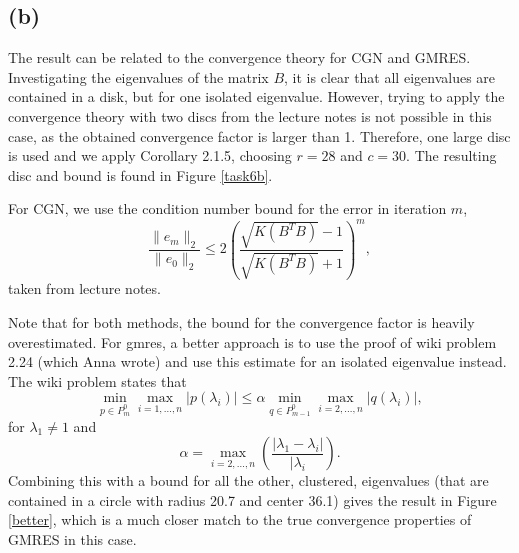 \subsection*{(b)}
The result can be related to the convergence theory for CGN and GMRES. Investigating the eigenvalues of the matrix $B$, it is clear that all eigenvalues are contained in a disk, but for one isolated eigenvalue. However, trying to apply the convergence theory with two discs from the lecture notes is not possible in this case, as the obtained convergence factor is larger than 1. Therefore, one large disc is used and we apply Corollary 2.1.5, choosing $r = 28$ and $c =30 $. The resulting disc and bound is found in Figure \ref{task6b}.

For CGN, we use the condition number bound for the error in iteration $m$,
\begin{equation}
\frac{\|e_m\|_2}{\|e_0\|_2}\leq 2\left(\frac{\sqrt{K(B^TB)}-1}{\sqrt{K(B^TB)}+1}\right)^m,
\end{equation}
taken from lecture notes.

Note that for both methods, the bound for the convergence factor is heavily overestimated. For gmres, a better approach is to use the proof of wiki problem 2.24 (which Anna wrote) and use this estimate for an isolated eigenvalue instead. The wiki problem states that 
\begin{equation}
\min_{p\in P_m^0}\max_{i = 1,\dots,n}|p(\lambda_i)|\leq \alpha \min_{q\in P_{m-1}^0}\max_{i = 2,\dots,n}|q(\lambda_i)|,
\end{equation}
for $\lambda_1\neq 1$ and 
\begin{equation}
\alpha  = \max_{i = 2,\dots, n}\left(\frac{|\lambda_1-\lambda_i|}{|\lambda_i}\right).
\end{equation}
Combining this with a bound for all the other, clustered, eigenvalues (that are contained in a circle with radius 20.7 and center 36.1) gives the result in Figure \ref{better}, which is a much closer match to the true convergence properties of GMRES in this case. 


